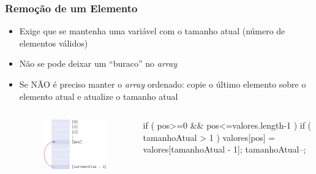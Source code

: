 \documentclass[xcolor={dvipsnames,table},aspectratio=169]{beamer}
\begin{document}
\begin{frame}[fragile]\frametitle{Remoção de um Elemento}
\begin{itemize}
	\item Exige que se mantenha uma variável com o tamanho atual (número de elementos válidos)
	\item Não se pode deixar um ``buraco'' no \emph{array}
	\item Se NÃO é preciso manter o \emph{array} ordenado: copie o último elemento sobre o elemento atual e atualize o tamanho atual
\begin{columns}[T]
	\begin{column}{0.35\linewidth}
\begin{figure}[h]
	\includegraphics[height=0.35\paperheight,center]{pucrs-ep-fprog-unidade_06-arrays-laminas-remocao_a.png}
\end{figure}
	\end{column}
	\begin{column}{0.65\linewidth}
{\scriptsize
\begin{javacode}
if ( pos>=0 && pos<=valores.length-1 ) {
   if ( tamanhoAtual > 1 ) {
      valores[pos] = valores[tamanhoAtual - 1];
   }
   tamanhoAtual--;
}
\end{javacode}
}
	\end{column}
\end{columns}
\end{itemize}
\end{frame}
\end{document}
